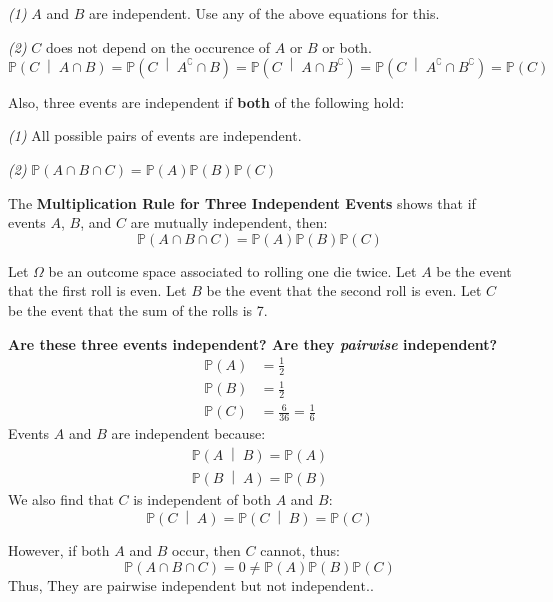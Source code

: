 \documentclass[titlepage, 12pt, leqno]{article}
\begin{document}
\textit{(1)} $A$ and $B$ are independent. Use any of the above equations for this.

\textit{(2)} $C$ does not depend on the occurence of $A$ or $B$ or both.
\[
\mathbb{P}\left(C \;\middle|\; A \cap B\right) = \mathbb{P}\left(C \;\middle|\; A^\complement \cap B\right) = \mathbb{P}\left(C \;\middle|\; A \cap B^\complement \right) = \mathbb{P}\left(C \;\middle|\; A^\complement \cap B^\complement \right) = \mathbb{P}(C)
\]

Also, three events are independent if \textbf{both} of the following hold:

\textit{(1)} All possible pairs of events are independent.

\textit{(2)} $\mathbb{P}(A \cap B \cap C) = \mathbb{P}(A)\mathbb{P}(B)\mathbb{P}(C)$ 

\begin{definition}
    The \textbf{Multiplication Rule for Three Independent Events} shows that if events $A$, $B$, and $C$ are mutually independent, then:
    \[
    \mathbb{P}(A \cap B \cap C) = \mathbb{P}(A)\mathbb{P}(B)\mathbb{P}(C)
    \]
\end{definition}

\begin{ex}
    Let $\Omega $ be an outcome space associated to rolling one die twice. Let $A$ be the event that the first roll is even. Let $B$ be the event that the second roll is even. Let $C$ be the event that the sum of the rolls is 7.

    \textbf{Are these three events independent? Are they \textit{pairwise} independent?} 
   \begin{align*}
       \mathbb{P}(A) &= \frac{1}{2} \\
       \mathbb{P}(B) &= \frac{1}{2} \\
       \mathbb{P}(C) &= \frac{6}{36} = \frac{1}{6} 
   \end{align*}
   Events $A$ and $B$ are independent because:
    \begin{align*}
      \mathbb{P}\left(A \;\middle|\; B\right) = \mathbb{P}(A) \\
      \mathbb{P}\left(B \;\middle|\; A\right) = \mathbb{P}(B)
    \end{align*}
    We also find that $C$ is independent of both $A$ and $B$:
    \[
    \mathbb{P}\left(C \;\middle|\; A\right) = \mathbb{P}\left(C \;\middle|\; B\right) = \mathbb{P}(C)
    \]
    
    However, if both $A$ and $B$ occur, then $C$ cannot, thus:
    \[
        \mathbb{P}(A \cap B \cap C) = 0 \ne \mathbb{P}(A)\mathbb{P}(B)\mathbb{P}(C)
    \]
    Thus, $\boxed{\text{They are pairwise independent but not independent.}}$. 
\end{ex}
\pagebreak
\end{document}
